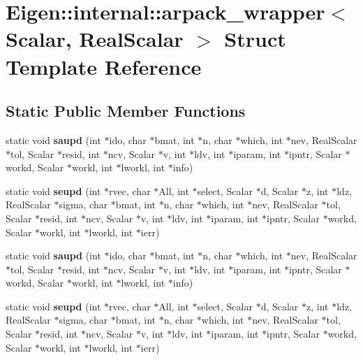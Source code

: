 \hypertarget{struct_eigen_1_1internal_1_1arpack__wrapper}{}\section{Eigen\+:\+:internal\+:\+:arpack\+\_\+wrapper$<$ Scalar, Real\+Scalar $>$ Struct Template Reference}
\label{struct_eigen_1_1internal_1_1arpack__wrapper}
\subsection*{Static Public Member Functions}
\begin{DoxyCompactItemize}
\item 
\mbox{\label{struct_eigen_1_1internal_1_1arpack__wrapper_a098a72250482df47291c851dab43f4be}} 
static void {\bfseries saupd} (int $\ast$ido, char $\ast$bmat, int $\ast$n, char $\ast$which, int $\ast$nev, Real\+Scalar $\ast$tol, Scalar $\ast$resid, int $\ast$ncv, Scalar $\ast$v, int $\ast$ldv, int $\ast$iparam, int $\ast$ipntr, Scalar $\ast$workd, Scalar $\ast$workl, int $\ast$lworkl, int $\ast$info)
\item 
\mbox{\label{struct_eigen_1_1internal_1_1arpack__wrapper_ac4f7ce364e0fd5d1456b710d1124ef68}} 
static void {\bfseries seupd} (int $\ast$rvec, char $\ast$All, int $\ast$select, Scalar $\ast$d, Scalar $\ast$z, int $\ast$ldz, Real\+Scalar $\ast$sigma, char $\ast$bmat, int $\ast$n, char $\ast$which, int $\ast$nev, Real\+Scalar $\ast$tol, Scalar $\ast$resid, int $\ast$ncv, Scalar $\ast$v, int $\ast$ldv, int $\ast$iparam, int $\ast$ipntr, Scalar $\ast$workd, Scalar $\ast$workl, int $\ast$lworkl, int $\ast$ierr)
\item 
\mbox{\label{struct_eigen_1_1internal_1_1arpack__wrapper_a098a72250482df47291c851dab43f4be}} 
static void {\bfseries saupd} (int $\ast$ido, char $\ast$bmat, int $\ast$n, char $\ast$which, int $\ast$nev, Real\+Scalar $\ast$tol, Scalar $\ast$resid, int $\ast$ncv, Scalar $\ast$v, int $\ast$ldv, int $\ast$iparam, int $\ast$ipntr, Scalar $\ast$workd, Scalar $\ast$workl, int $\ast$lworkl, int $\ast$info)
\item 
\mbox{\label{struct_eigen_1_1internal_1_1arpack__wrapper_ac4f7ce364e0fd5d1456b710d1124ef68}} 
static void {\bfseries seupd} (int $\ast$rvec, char $\ast$All, int $\ast$select, Scalar $\ast$d, Scalar $\ast$z, int $\ast$ldz, Real\+Scalar $\ast$sigma, char $\ast$bmat, int $\ast$n, char $\ast$which, int $\ast$nev, Real\+Scalar $\ast$tol, Scalar $\ast$resid, int $\ast$ncv, Scalar $\ast$v, int $\ast$ldv, int $\ast$iparam, int $\ast$ipntr, Scalar $\ast$workd, Scalar $\ast$workl, int $\ast$lworkl, int $\ast$ierr)
\end{DoxyCompactItemize}


